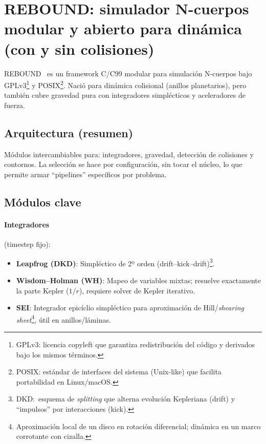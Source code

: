 \section[REBOUND]{REBOUND: simulador N-cuerpos modular y abierto para dinámica (con y sin colisiones)}

REBOUND~\cite{Rein2012} es un framework C/C99 modular para simulación N-cuerpos bajo GPLv3\footnote{GPLv3: licencia copyleft que garantiza redistribución del código y derivados bajo los mismos términos.} y POSIX\footnote{POSIX: estándar de interfaces del sistema (Unix-like) que facilita portabilidad en Linux/macOS.}. Nació para dinámica colisional (anillos planetarios), pero también cubre gravedad pura con integradores simplécticos y aceleradores de fuerza.

\subsection{Arquitectura (resumen)}
Módulos intercambiables para: integradores, gravedad, detección de colisiones y contornos. La selección se hace por configuración, sin tocar el núcleo, lo que permite armar ``pipelines'' específicos por problema.

\subsection{Módulos clave}
\paragraph{Integradores} (timestep fijo):
\begin{itemize}
  \item \textbf{Leapfrog (DKD)}: Simpléctico de 2º orden (drift–kick–drift)\footnote{DKD:\ esquema de \emph{splitting} que alterna evolución Kepleriana (drift) y ``impulsos'' por interacciones (kick).}.
  \item \textbf{Wisdom–Holman (WH)}: Mapeo de variables mixtas; resuelve exactamente la parte Kepler ($1/r$), requiere solver de Kepler iterativo.
  \item \textbf{SEI}: Integrador epicíclio simpléctico para aproximación de Hill/\emph{shearing sheet}\footnote{Aproximación local de un disco en rotación diferencial; dinámica en un marco corrotante con cizalla.}, útil en anillos/láminas.
\end{itemize}

